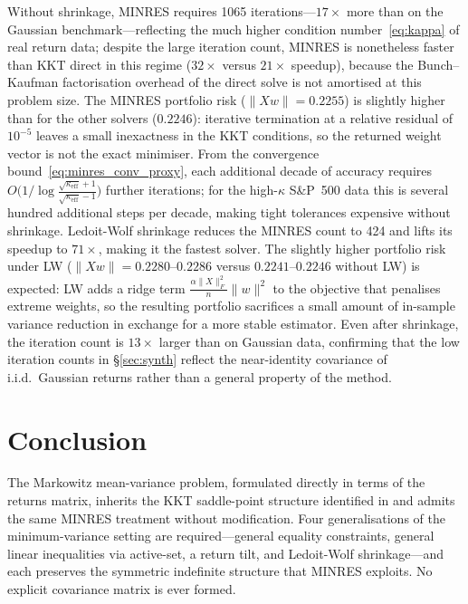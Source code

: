 \documentclass{siam/siamart}
\begin{document}
Without shrinkage, MINRES requires 1065 iterations---$17\times$ more than on the
Gaussian benchmark---reflecting the much higher condition number~\eqref{eq:kappa} of
real return data; despite the large iteration count, MINRES is nonetheless faster than
KKT direct in this regime ($32\times$ versus $21\times$ speedup), because the Bunch--Kaufman
factorisation overhead of the direct solve is not amortised at this problem size.
The MINRES portfolio risk ($\|Xw\| = 0.2255$) is slightly higher than for
the other solvers ($0.2246$): iterative termination at a relative residual of $10^{-5}$
leaves a small inexactness in the KKT conditions, so the returned weight vector is not
the exact minimiser.  From the convergence bound~\eqref{eq:minres_conv_proxy}, each additional
decade of accuracy requires $O\!\bigl(1/\log\tfrac{\sqrt{\kappa_{\mathrm{eff}}}+1}{\sqrt{\kappa_{\mathrm{eff}}}-1}\bigr)$
further iterations; for the high-$\kappa$ S\&P~500 data this is several hundred additional
steps per decade, making tight tolerances expensive without shrinkage.  Ledoit-Wolf shrinkage reduces the MINRES count to 424 and lifts
its speedup to $71\times$, making it the fastest solver.  The slightly higher portfolio
risk under LW ($\|Xw\| = 0.2280$--$0.2286$ versus $0.2241$--$0.2246$ without LW) is
expected: LW adds a ridge term $\tfrac{\alpha\|X\|_F^2}{n}\|w\|^2$ to the objective that penalises
extreme weights, so the resulting portfolio sacrifices a small amount of in-sample variance
reduction in exchange for a more stable estimator.  Even after shrinkage, the
iteration count is $13\times$ larger than on Gaussian data, confirming that the low
iteration counts in \S\ref{sec:synth} reflect the near-identity covariance of
i.i.d.\ Gaussian returns rather than a general property of the method.

\section{Conclusion}

The Markowitz mean-variance problem, formulated directly in terms of the returns
matrix, inherits the KKT saddle-point structure identified in \cite{minvar_paper}
and admits the same MINRES treatment without modification.  Four generalisations
of the minimum-variance setting are required---general equality constraints,
general linear inequalities via active-set, a return tilt, and Ledoit-Wolf
shrinkage---and each preserves the symmetric indefinite structure that MINRES
exploits.  No explicit covariance matrix is ever formed.
\end{document}
